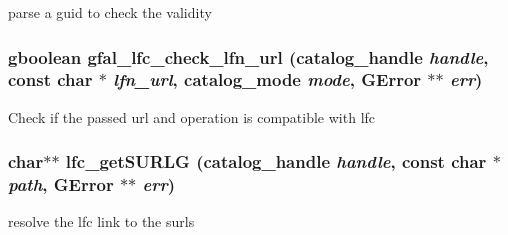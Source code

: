 parse a guid to check the validity 
\subsubsection{\setlength{\rightskip}{0pt plus 5cm}gboolean gfal\_\-lfc\_\-check\_\-lfn\_\-url (catalog\_\-handle {\em handle}, const char $\ast$ {\em lfn\_\-url}, catalog\_\-mode {\em mode}, GError $\ast$$\ast$ {\em err})}\label{gfal__common__lfc_8h_8baa624b528deb15ff4ee61fa9948ac8}


Check if the passed url and operation is compatible with lfc 
\subsubsection{\setlength{\rightskip}{0pt plus 5cm}char$\ast$$\ast$ lfc\_\-get\-SURLG (catalog\_\-handle {\em handle}, const char $\ast$ {\em path}, GError $\ast$$\ast$ {\em err})}\label{gfal__common__lfc_8h_7c1d8699d8ad924234db163860dadf40}


resolve the lfc link to the surls 